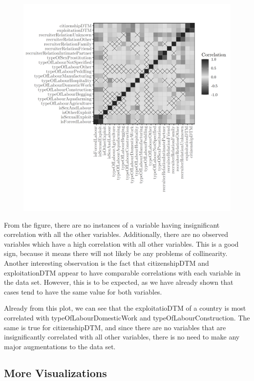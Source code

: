 \documentclass{article} %
\begin{document}
\FloatBarrier
\begin{figure}[H]
	\includegraphics[width = \textwidth]{CorrPlot}
\end{figure}
\FloatBarrier

From the figure, there are no instances of a variable having insignificant correlation with all the other variables. Additionally, there are no observed variables which have a high correlation with all other variables. This is a good sign, because it means there will not likely be any problems of collinearity. Another interesting observation is the fact that citizenshipDTM and exploitationDTM appear to have comparable correlations with each variable in the data set. However, this is to be expected, as we have already shown that cases tend to have the same value for both variables. 

Already from this plot, we can see that the exploitatioDTM of a country is most correlated with typeOfLabourDomesticWork and typeOfLabourConstruction. The same is true for citizenshipDTM, and since there are no variables that are insignificantly correlated with all other variables, there is no need to make any major augmentations to the data set.

\subsection{More Visualizations}
\end{document}
